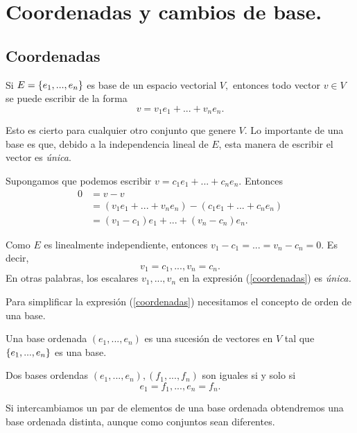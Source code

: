 \section{Coordenadas y cambios de base.}
\label{sec:coordenadas}

\subsection*{Coordenadas}

Si $E=\left\{ e_{1},...,e_{n} \right\}$ es base de un espacio vectorial $V,$ entonces todo vector $v\in V$ se puede escribir de la
forma
\begin{equation}
 \label{coordenadas}
 v=v_{1}e_{1}+...+v_{n}e_{n}.
\end{equation}

Esto es cierto para cualquier otro conjunto que genere $V.$ Lo importante de una base es que, debido a la independencia
lineal de $E$, esta manera de escribir el vector es \emph{única}.

Supongamos que podemos escribir $v=c_{1}e_{1}+...+c_{n}e_{n}.$ Entonces
\begin{align*}
 0&=v-v \\
 &=(v_{1}e_{1}+...+v_{n}e_{n})-(c_{1}e_{1}+...+c_{n}e_{n}) \\
&=(v_{1}-c_{1})e_{1}+...+(v_{n}-c_{n})e_{n}.
\end{align*}

Como $E$ es linealmente independiente, entonces $v_{1}-c_{1}=...=v_{n}-c_{n}=0.$ Es decir,
$$
v_{1}=c_{1},  ...,v_{n}=c_{n}.
$$
En otras palabras, los escalares $v_{1},...,v_{n}$ en la expresi\'on (\ref{coordenadas}) es \emph{única.}

Para simplificar la expresi\'on (\ref{coordenadas}) necesitamos el concepto de orden de una base.

\begin{defn}
 Una base ordenada $\left( e_{1},...,e_{n} \right)$ es una sucesi\'on de vectores en $V$ tal que
 $\left\{ e_{1},...,e_{n} \right\}$ es una base.

 Dos bases ordendas $\left( e_{1},...,e_{n} \right), \left( f_{1},...,f_{n} \right)$ son iguales si y solo si
$$e_{1}=f_{1},..., e_{n}=f_{n}.$$
\end{defn}

\begin{rem}
 Si intercambiamos un par de elementos de una base ordenada obtendremos una base ordenada distinta, aunque como
conjuntos sean diferentes.
\end{rem}

